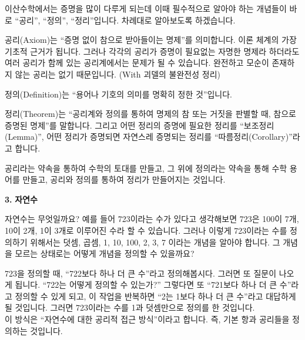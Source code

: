 \begin{flushleft}
    이산수학에서는 증명을 많이 다루게 되는데 이때 필수적으로 알아야 하는 개념들이 바로 “공리”, “정의”, “정리”입니다. 차례대로 알아보도록 하겠습니다.
    
    \bigskip
    공리(Axiom)는 “증명 없이 참으로 받아들이는 명제”를 의미합니다. 이론 체계의 가장 기초적 근거가 됩니다. 그러나 각각의 공리가 증명이 필요없는 자명한 명제라 하더라도 여러 공리가 함께 있는 공리계에서는 문제가 될 수 있습니다. 완전하고 모순이 존재하지 않는 공리는 없기 때문입니다. (With 괴델의 불완전성 정리)
    
    \bigskip
    정의(Definition)는 “용어나 기호의 의미를 명확히 정한 것”입니다.
    
    \bigskip
    정리(Theorem)는 “공리계와 정의를 통하여 명제의 참 또는 거짓을 판별할 때, 참으로 증명된 명제”를 말합니다. 그리고 어떤 정리의 증명에 필요한 정리를 “보조정리(Lemma)”, 어떤 정리가 증명되면 자연스레 증명되는 정리를 “따름정리(Corollary)”라고 합니다.
\end{flushleft}

\begin{tcolorbox}[colback = white, colframe = Definition, title = \textmd{이해하기: 공의, 정의, 정리}]
    공리라는 약속을 통하여 수학의 토대를 만들고, 그 위에 정의라는 약속을 통해 수학 용어를 만들고, 공리와 정의를 통하여 정리가 만들어지는 것입니다.
\end{tcolorbox}

\bigskip
\begin{flushleft}
    {\setmainfont[Path=FONT/]{KOPUBWORLD_DOTUM_PRO_BOLD.OTF}\textcolor{header}{{\huge\textbf{3.}}}}
    {\textcolor{header}{{\huge\textbf{자연수}}}}
\end{flushleft}

\begin{flushleft}
    자연수는 무엇일까요? 예를 들어 723이라는 수가 있다고 생각해보면 723은 100이 7개, 10이 2개, 1이 3개로 이루어진 수라 할 수 있습니다. 그러나 이렇게 723이라는 수를 정의하기 위해서는 덧셈, 곱셈, 1, 10, 100, 2, 3, 7 이라는 개념을 알아야 합니다. 그 개념을 모르는 상태로는 어떻게 개념을 정의할 수 있을까요?

    \bigskip
    723을 정의할 때, “722보다 하나 더 큰 수”라고 정의해봅시다. 그러면 또 질문이 나오게 됩니다. “722는 어떻게 정의할 수 있는가?” 그렇다면 또 “721보다 하나 더 큰 수”라고 정의할 수 있게 되고, 이 작업을 반복하면 “2는 1보다 하나 더 큰 수”라고 대답하게 될 것입니다. 그러면 723이라는 수를 1과 덧셈만으로 정의를 한 것입니다. \\ 이 방식은 “자연수에 대한 공리적 접근 방식”이라고 합니다. 즉, 기본 항과 공리들을 정의하는 것입니다.
\end{flushleft}

